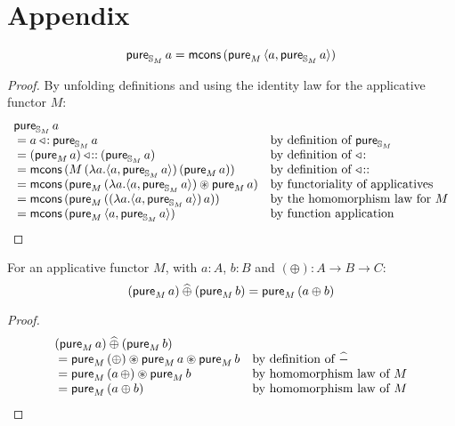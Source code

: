 
\section{Appendix}

\begin{lemmaa}{4}
$$
\mathsf{pure}_{\mathbb{S}_{M}}\,a = \mathsf{mcons}\,(\mathsf{pure}_M\,\langle a, \mathsf{pure}_{\mathbb{S}_{M}}\,a\rangle)
$$
\end{lemmaa}
\begin{proof}
By unfolding definitions and using the identity law for the applicative functor $M$:
$$
\begin{array}{ll}
\mathsf{pure}_{\mathbb{S}_{M}}\,a \\
{}= a \mathbin{\triangleleft\!:} \mathsf{pure}_{\mathbb{S}_{M}}\,a
  & \mbox{by definition of }\mathsf{pure}_{\mathbb{S}_{M}} \\
{}= (\mathsf{pure}_M\,a) \mathbin{\triangleleft\!::} (\mathsf{pure}_{\mathbb{S}_{M}}\,a)
  & \mbox{by definition of }\mathbin{\triangleleft\!:}\\
{}=  \mathsf{mcons}\, (M\,(\lambda a. \langle a, \mathsf{pure}_{\mathbb{S}_{M}}\,a\rangle)\,(\mathsf{pure}_M\,a))
  & \mbox{by definition of }\mathbin{\triangleleft\!::}\\
{}= \mathsf{mcons}\, (\mathsf{pure}_M\,(\lambda a. \langle a, \mathsf{pure}_{\mathbb{S}_{M}}\,a\rangle) \circledast \mathsf{pure}_M\,a)
  & \mbox{by functoriality of applicatives}\\
{}= \mathsf{mcons}\, (\mathsf{pure}_M\,((\lambda a. \langle a, \mathsf{pure}_{\mathbb{S}_{M}}\,a\rangle)\,a))
  & \mbox{by the homomorphism law for }M\\
{}= \mathsf{mcons}\, (\mathsf{pure}_M\,\langle a, \mathsf{pure}_{\mathbb{S}_{M}}\,a\rangle)
  & \mbox{by function application}
\end{array}
$$
\end{proof}


\begin{lemmaa}{8}
For an applicative functor $M$, with $a:A$, $b:B$ and $(\oplus) : A \rightarrow B \rightarrow C$:
$$
(\mathsf{pure}_M\, a) \mathbin{\widehat{\oplus}} (\mathsf{pure}_M\, b) = \mathsf{pure}_M\, (a \oplus b)
$$
\end{lemmaa}
\begin{proof}
$$
\begin{array}{ll}
(\mathsf{pure}_M\, a) \mathbin{\widehat{\oplus}} (\mathsf{pure}_M\, b) \\
{}= \mathsf{pure}_M\, (\oplus) \circledast \mathsf{pure}_M\, a \circledast \mathsf{pure}_M\, b
  & \mbox{by definition of }\mathbin{\widehat{-}}\\
{}= \mathsf{pure}_M\, (a\, \oplus) \circledast \mathsf{pure}_M\, b
  & \mbox{by homomorphism law of }M\\
{}= \mathsf{pure}_M\, (a \oplus b)
  & \mbox{by homomorphism law of }M\\
\end{array}
$$
\end{proof}

